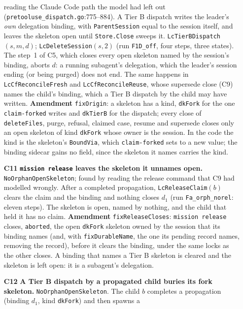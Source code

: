 \documentclass[a4paper,10pt,fleqn]{article}
\newcommand{\fpath}[1]{\texttt{#1}}
\newcommand{\field}[1]{\texttt{#1}}
\begin{document}
\begin{enumerate}
    reading the Claude Code path the model had left out
    (\fpath{pretooluse\_dispatch.go}:775--884). A Tier B dispatch writes the
    leader's \emph{own} delegation binding, with \field{ParentSession} equal
    to the session itself, and leaves the skeleton open until
    \field{Store.Close} sweeps it. \field{LcTierBDispatch}$(s,m,d)$;
    \field{LcDeleteSession}$(s,2)$ (run \texttt{F1D\_off}, four steps, three
    states). The step~1 of C5, which closes every open skeleton named by the
    session's binding, aborts $d$: a running subagent's delegation, which the
    leader's session ending (or being purged) does not end. The same happens
    in \field{LcCfReconcileFresh} and \field{LcCfReconcileReuse}, whose
    supersede close (C9) names the child's binding, which a Tier B dispatch by
    the child may have written. \textbf{Amendment} \field{fixOrigin}: a
    skeleton has a kind, \field{dkFork} for the one \field{claim-forked}
    writes and \field{dkTierB} for the dispatch; every close of
    \field{deleteFiles}, purge, refusal, claimed case, resume and supersede
    closes only an open skeleton of kind \field{dkFork} whose owner is the
    session. In the code the kind is the skeleton's \field{BoundVia}, which
    \field{claim-forked} sets to a new value; the binding sidecar gains no
    field, since the skeleton it names carries the kind.
  \item[\textbf{C11}] \textbf{\field{mission release} leaves the skeleton it
    unnames open.} \field{NoOrphanOpenSkeleton}; found by reading the
    release command that C9 had modelled wrongly. After a completed
    propagation, \field{LcReleaseClaim}$(b)$ clears the claim and the binding
    and nothing closes $d_1$ (run \texttt{Fa\_orph\_norel}: eleven steps). The
    skeleton is open, named by nothing, and the child that held it has no claim.
    \textbf{Amendment} \field{fixReleaseCloses}: \field{mission release} closes,
    \field{aborted}, the open \field{dkFork} skeleton owned by the session that
    its binding names (and, with \field{fixDurableName}, the one its pending
    record names, removing the record), before it clears the binding, under
    the same locks as the other closes. A binding that names a Tier B skeleton is cleared
    and the skeleton is left open: it is a subagent's delegation.
  \item[\textbf{C12}] \textbf{A Tier B dispatch by a propagated child buries
    its fork skeleton.} \field{NoOrphanOpenSkeleton}. The child $b$ completes
    a propagation (binding $d_1$, kind \field{dkFork}) and then spawns a

\end{enumerate}
\end{document}
